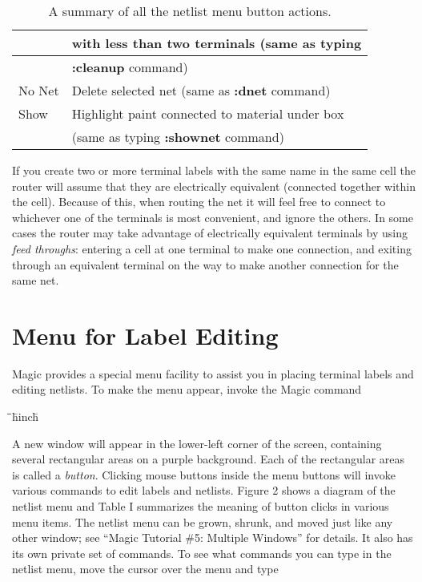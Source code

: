 \documentclass[letterpaper,twoside,12pt]{article}
\def\hinch{\hspace*{0.5in}}
\def\starti{\begin{center}\begin{tabbing}\hinch\=\hinch\=\hinch\=hinch\hinch\=\kill}
\def\endi{\end{tabbing}\end{center}}
\def\ii{\>\>\>}
\begin{document}
\begin{table}[ht]
\begin{center}
\begin{tabular}{|l|l|}
			& with less than two terminals (same as typing \\ \hline
			& {\bfseries :cleanup} command) \\
	No Net		& Delete selected net (same as {\bfseries :dnet} command) \\
				\hline
	Show		& Highlight paint connected to material under box \\
			& (same as typing {\bfseries :shownet} command) \\ \hline
      \end{tabular}
      \caption{A summary of all the netlist menu button actions.}
   \end{center}
\end{table}

If you create two or more terminal labels with the same name in the same cell
the router will assume that they are electrically equivalent (connected
together within the cell).
Because of this, when routing the net it will feel free to connect to
whichever one of the terminals is most convenient, and ignore the others.
In some cases the router may take advantage of electrically equivalent
terminals by using {\itshape feed throughs}: entering a cell at one terminal to make
one connection, and exiting through an equivalent terminal on the way to make
another connection for the same net.

\section{Menu for Label Editing}

Magic provides a special menu facility to assist you in placing terminal labels
and editing netlists.  To make the menu appear, invoke the Magic command

\starti
   \ii {\bfseries :specialopen netlist}
\endi

A new window will appear in the lower-left corner of the screen,
containing several rectangular areas on a purple background.  Each
of the rectangular areas is called a {\itshape button}.  Clicking
mouse buttons inside the menu buttons will invoke various
commands to edit labels and netlists.
Figure 2 shows a diagram of the netlist menu and Table I summarizes
the meaning of button clicks in various menu items.
The netlist menu can be grown, shrunk, and moved just like any other
window;  see ``Magic Tutorial \#5: Multiple Windows'' for details.
It also has its own private set of commands.  To see what commands
you can type in the netlist menu, move the cursor over the menu and
type
\end{document}
